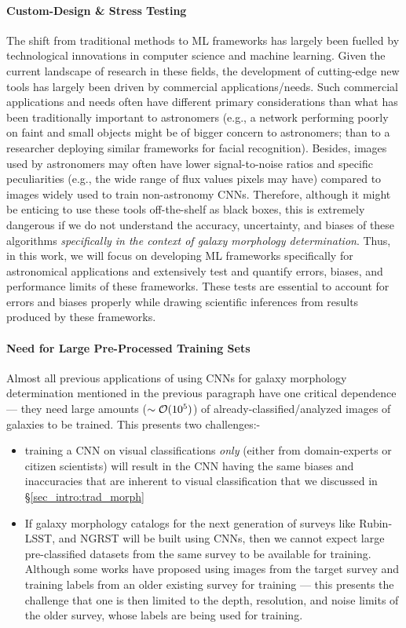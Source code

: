 \paragraph{Custom-Design \& Stress Testing} The shift from traditional methods to ML frameworks has largely been fuelled by technological innovations in computer science and machine learning. Given the current landscape of research in these fields, the development of cutting-edge new tools has largely been driven by commercial applications/needs. Such commercial applications and needs often have different primary considerations than what has been traditionally important to astronomers (e.g., a network performing poorly on faint and small objects might be of bigger concern to astronomers; than to a researcher deploying similar frameworks for facial recognition). Besides, images used by astronomers may often have lower signal-to-noise ratios and specific peculiarities (e.g., the wide range of flux values pixels may have) compared to images widely used to train non-astronomy CNNs. Therefore, although it might be enticing to use these tools off-the-shelf as black boxes, this is extremely dangerous if we do not understand the accuracy, uncertainty, and biases of these algorithms \textit{specifically in the context of galaxy morphology determination}. Thus, in this work, we will focus on developing ML frameworks specifically for astronomical applications and extensively test and quantify errors, biases, and performance limits of these frameworks. These tests are essential to account for errors and biases properly while drawing scientific inferences from results produced by these frameworks. 

\paragraph{Need for Large Pre-Processed Training Sets} Almost all previous applications of using CNNs for galaxy morphology determination mentioned in the previous paragraph have one critical dependence --- they need large amounts ($\sim \mathcal{O}(10^{5})$) of already-classified/analyzed images of galaxies to be trained. This presents two challenges:- 

\begin{itemize}
    \item training a CNN on visual classifications \textit{only} (either from domain-experts or citizen scientists) will result in the CNN having the same biases and inaccuracies that are inherent to visual classification that we discussed in \S \ref{sec_intro:trad_morph}
    \item If galaxy morphology catalogs for the next generation of surveys like Rubin-LSST, and NGRST will be built using CNNs, then we cannot expect large pre-classified datasets from the same survey to be available  for training. Although some works \citep[e.g.,][]{Cheng2021GalaxyNetworks} have proposed using images from the target survey and training labels from an older existing survey for training --- this presents the challenge that one is then limited to the depth, resolution, and noise limits of the older survey, whose labels are being used for training. 
\end{itemize}

